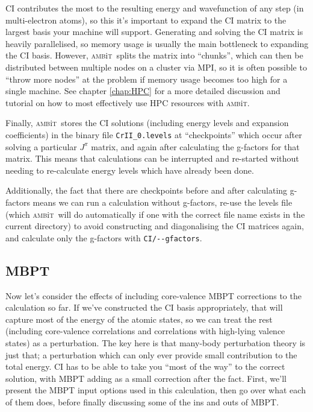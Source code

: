 \documentclass{report}
\newcommand{\ambit}{\textsc{amb}{\footnotesize i}\textsc{t}}
\begin{document}
CI contributes the most to the resulting energy and wavefunction of any step (in multi-electron atoms),
so this it's important to expand the CI matrix to the largest basis your machine will support.
Generating and solving the CI matrix is heavily parallelised, so memory usage is usually the main
bottleneck to expanding the CI basis. However, \ambit\  splits the matrix into ``chunks'', which can then
be distributed between multiple nodes on a cluster via MPI, so it is often possible to ``throw more
nodes'' at the problem if memory usage becomes too high for a single machine. See chapter \ref{chap:HPC}
for a more detailed discussion and tutorial on how to most effectively use HPC resources with \ambit.

Finally, \ambit\  stores the CI solutions (including energy levels and expansion coefficients) in the 
binary file \texttt{CrII\_0.levels} at ``checkpoints'' which occur after solving a particular $J^{\pi}$ 
matrix, and again after calculating the g-factors for that matrix. This means that calculations can be
interrupted and re-started without needing to re-calculate energy levels which have already been done.

Additionally, the fact that there are checkpoints before and after calculating g-factors means we can
run a calculation without g-factors, re-use the levels file (which \ambit\  will do automatically if one 
with the correct file name exists in the current directory) to avoid constructing and diagonalising 
the CI matrices again, and calculate only the g-factors with \texttt{CI/{-}{-}gfactors}.

\subsection{MBPT}

Now let's consider the effects of including core-valence MBPT corrections to the calculation so far. If 
we've constructed the CI basis appropriately, that will capture most of the energy of the atomic states,
so we can treat the rest (including core-valence correlations and correlations with high-lying valence 
states) as a perturbation. The key here is that many-body perturbation theory is just that; a 
perturbation which can only ever provide small contribution to the total energy. CI has to be able to 
take you ``most of the way'' to the correct solution, with MBPT adding as a small correction after the 
fact. First, we'll present the MBPT input options used in this calculation, then go over what each of 
them does, before finally discussing some of the ins and outs of MBPT.
\end{document}
